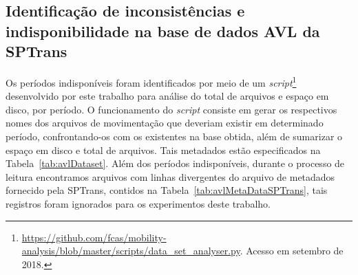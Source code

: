 \documentclass[
	12pt,				%
	oneside,			%
	a4paper,			%
	english,			%
	brazil				%
	]{abntex2ppgsi}
\begin{document}
{{\subsection{Identificação de inconsistências e indisponibilidade na base de dados AVL da  SPTrans}

Os períodos indisponíveis foram identificados por meio de um \textit{script}\footnote{\url{https://github.com/fcas/mobility-analysis/blob/master/scripts/data_set_analyser.py}. Acesso em setembro de 2018.} desenvolvido por este trabalho para análise do total de arquivos e espaço em disco, por período. O funcionamento do \textit{script} consiste em gerar os respectivos nomes dos arquivos de movimentação que deveriam existir em determinado período, confrontando-os com os existentes na base obtida, além de sumarizar o espaço em disco e total de arquivos. Tais metadados estão especificados na Tabela~\ref{tab:avlDataset}. Além dos períodos indisponíveis, durante o processo de leitura encontramos arquivos com linhas divergentes do arquivo de metadados fornecido pela SPTrans, contidos na Tabela~\ref{tab:avlMetaDataSPTrans}, tais registros foram ignorados para os experimentos deste trabalho.

}}
\end{document}
